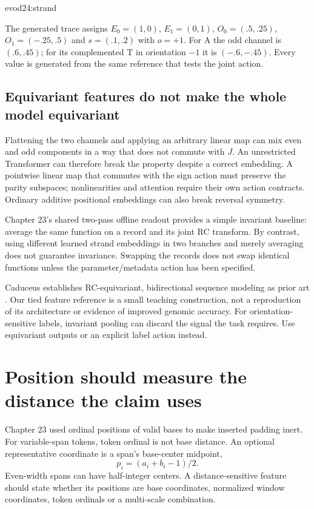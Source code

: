 {evod24:strand}

\begin{center}\small\end{center}
The generated trace assigns $E_0=(1,0)$, $E_1=(0,1)$,
$O_0=(.5,.25)$, $O_1=(-.25,.5)$ and $s=(.1,.2)$ with $o=+1$.
For A the odd channel is $(.6,.45)$; for its complemented T in orientation $-1$
it is $(-.6,-.45)$. Every value is generated from the same reference that tests
the joint action.

\subsection{Equivariant features do not make the whole model equivariant}
Flattening the two channels and applying an arbitrary linear map can mix even
and odd components in a way that does not commute with $J$.
An unrestricted Transformer can therefore break the property despite a correct
embedding. A pointwise linear map that commutes with the sign action must preserve
the parity subspaces; nonlinearities and attention require their own action
contracts. Ordinary additive positional embeddings can also break reversal
symmetry.

Chapter 23's shared two-pass offline readout provides a simple invariant baseline:
average the same function on a record and its joint RC transform.
By contrast, using different learned strand embeddings in two branches and merely
averaging does not guarantee invariance. Swapping the records does not swap
identical functions unless the parameter/metadata action has been specified.

Caduceus establishes RC-equivariant, bidirectional sequence modeling as prior art
\cite{evod24:caduceus}. Our tied feature reference is a small teaching construction,
not a reproduction of its architecture or evidence of improved genomic accuracy.
For orientation-sensitive labels, invariant pooling can discard the signal the
task requires. Use equivariant outputs or an explicit label action instead.

\section{Position should measure the distance the claim uses}
Chapter 23 used ordinal positions of valid bases to make inserted padding inert.
For variable-span tokens, token ordinal is not base distance. An optional
representative coordinate is a span's base-center midpoint,
\[
p_i=(a_i+b_i-1)/2.
\]
Even-width spans can have half-integer centers. A distance-sensitive feature should
state whether its positions are base coordinates, normalized window coordinates,
token ordinals or a multi-scale combination.

